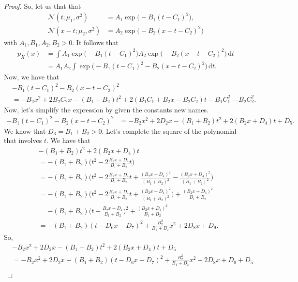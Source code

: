 \documentclass[10pt]{article}
\newcommand{\dee}{\mathrm{d}}
\newcommand{\mcal}[1]{\mathcal{#1}}
\begin{document}
\begin{itemize}
\begin{proof}
    So, let us that that
    \begin{align*}
      \mcal{N}(t;\mu_1, \sigma^2) &= A_1 \exp\big(-B_1(t - C_1)^2\big), \\
      \mcal{N}(x - t;\mu_2, \sigma^2) &= A_2 \exp\big(-B_2(x - t - C_2)^2\big)
    \end{align*}
    with $A_1, B_1, A_2, B_2 > 0$.
    It follows that
    \begin{align*}
      p_X(x) 
      &= \int A_1 \exp\big(-B_1(t - C_1)^2\big)A_2 \exp\big(-B_2(x - t - C_2)^2\big)\, \dee t \\
      &= A_1 A_2 \int \exp\big(-B_1(t - C_1)^2 - B_2(x - t - C_2)^2 \big)\, \dee t.
    \end{align*}
    Now, we have that
    \begin{align*}
      &-B_1(t-C_1)^2 - B_2(x - t - C_2)^2 \\
      &= -B_2x^2 + 2B_2 C_2 x - (B_1 + B_2)t^2 +2(B_1 C_1 + B_2 x - B_2C_2) t - B_1C_1^2 -B_2C_2^2.
    \end{align*}
    Now, let's simplify the expression by given the constants new names.
    \begin{align*}
      -B_1(t-C_1)^2 - B_2(x - t - C_2)^2
      &= -B_2 x^2 + 2D_2 x - (B_1 + B_2) t^2 + 2(B_2x + D_4)t + D_5.
    \end{align*}
    We know that $D_3 = B_1 + B_2 > 0$. Let's complete the square of the polynomial that involves $t$. We have that
    \begin{align*}
      &-(B_1 + B_2) t^2 + 2(B_2x + D_4)t \\
      &= -(B_1 + B_2)\bigg( t^2 - 2\frac{B_2 x + D_4}{B_1 + B_2} t \bigg) \\
      &= -(B_1 + B_2)\bigg( t^2 - 2\frac{B_2 x + D_4}{B_1 + B_2} t + \frac{(B_2 x + D_4)^2}{(B_1 + B_2)^2} - \frac{(B_2 x + D_4)^2}{(B_1 + B_2)^2} \bigg) \\
      &= -(B_1 + B_2)\bigg( t^2 - 2\frac{B_2 x + D_4}{B_1 + B_2} t + \frac{(B_2 x + D_4)^2}{(B_1 + B_2)^2}  \bigg) + \frac{(B_2 x + D_4)^2}{B_1 + B_2} \\
      &= -(B_1 + B_2)\bigg( t - \frac{B_2 x + D_4}{B_1 + B_2} \bigg)^2 + \frac{(B_2 x + D_4)^2}{B_1 + B_2} \\
      &= -(B_1 + B_2)( t - D_6 x - D_7)^2 + \frac{B_2^2}{B_1+B_2} x^2 + 2D_8x + D_9.
    \end{align*}
    So,
    \begin{align*}
      &-B_2 x^2 + 2D_2 x - (B_1 + B_2) t^2 + 2(B_2x + D_4)t + D_5 \\
      &= -B_2 x^2 + 2D_2 x -(B_1 + B_2)( t - D_6 x - D_7)^2 + \frac{B_2^2}{B_1+B_2} x^2 + 2D_8x + D_9 + D_5 \\

\end{align*}
\end{proof}
\end{itemize}
\end{document}
